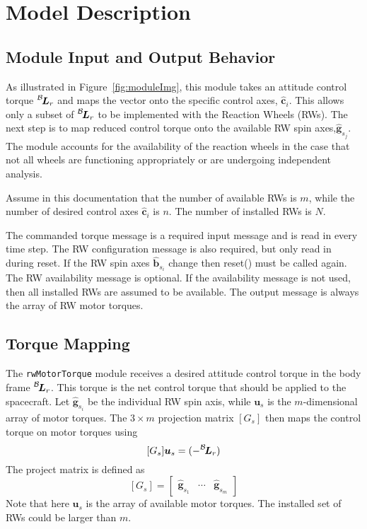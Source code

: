 

\section{Model Description}

\subsection{Module Input and Output Behavior}
As illustrated in Figure~\ref{fig:moduleImg}, this module takes an attitude control torque $\leftexp{B}{\bm L_{r}}$ and maps the vector onto the specific control axes, $\hat{\bm c}_{i}$.  This allows only a subset of $\leftexp{B}{\bm L_{r}}$ to be implemented with the Reaction Wheels (RWs).  The next step is to map reduced control torque onto  the available RW spin axes,$\hat{\bm g}_{s_j}$. The module accounts for the availability of the reaction wheels in the case that not all wheels are functioning appropriately or are undergoing independent analysis.  

Assume in this documentation that the number of available RWs is $m$, while the number of desired control axes $\hat{\bm c}_{i}$ is $n$.  The number of installed RWs is $N$.

The commanded torque message is a required input message and is read in every time step.  The RW configuration message is also required, but only read in during reset.  If the RW spin axes $\hat{\bm b}_{s_{i}}$ change then reset() must be called again.  The RW availability message is optional.  If the availability message is not used, then all installed RWs are assumed to be available.  The output message is always the array of RW motor torques.  



\subsection{Torque Mapping}
The {\tt rwMotorTorque} module receives a desired attitude control torque in the body frame $\leftexp{B}{\bm L}_r$.  This torque is the net control torque that should be applied to the spacecraft. Let $\hat{\bm g}_{s_{i}}$ be the individual RW spin axis, while $\bm u_{s}$ is the $m$-dimensional array of motor torques.  The $3\times m$ projection matrix $[G_{s}]$ then maps the control torque on motor torques using
\begin{equation}
	\label{eq:rwtm1}
	[G_{s}] \bm u_{s} = (-\leftexp{B}{\bm L}_r)
\end{equation}
The project matrix is defined as
\begin{equation}
	\label{eq:rwtm2}
	[G_{s}] = \begin{bmatrix}
		\hat{\bm g}_{s_{1}} & \cdots & \hat{\bm g}_{s_{m}}
	\end{bmatrix}
\end{equation}
Note that here $\bm u_{s}$ is the array of available motor torques.  The installed set of RWs could be larger than $m$.  

